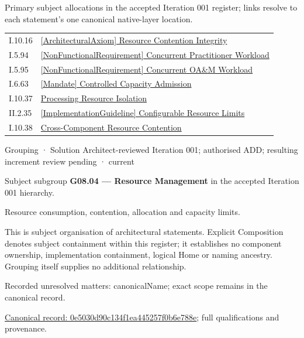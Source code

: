 Primary subject allocations in the accepted Iteration 001 register; links resolve to each statement’s one canonical native-layer location.\par
\begin{longtable}{p{.22\linewidth}p{.73\linewidth}}
I.10.16 & \hyperref[element:db8d320dc4c0454080f8c0f3c4e52801]{[ArchitecturalAxiom] Resource Contention Integrity} \\
I.5.94 & \hyperref[element:e77f2e780a974dde99815ff63158941c]{[NonFunctionalRequirement] Concurrent Practitioner Workload} \\
I.5.95 & \hyperref[element:5220295ae5d144468066ae70683e0f19]{[NonFunctionalRequirement] Concurrent OA\&M Workload} \\
I.6.63 & \hyperref[element:fb30eb9b8a3c41eda3a8b5edfee95ac1]{[Mandate] Controlled Capacity Admission} \\
I.10.37 & \hyperref[element:41ce95e00e064d809ad4bda818705510]{Processing Resource Isolation} \\
II.2.35 & \hyperref[element:4621a5cb0dbe445488439ac03398a8b5]{[ImplementationGuideline] Configurable Resource Limits} \\
I.10.38 & \hyperref[element:5bd9cc19d41e47d49978afaeea8343ed]{Cross-Component Resource Contention} \\
\end{longtable}
\label{element:0e5030d90c134f1ea445257f0b6e788e}
{\small Grouping · Solution Architect-reviewed Iteration 001; authorised ADD; resulting increment review pending · current}\par

Subject subgroup \textbf{G08.04 — Resource Management} in the accepted Iteration 001 hierarchy.



Resource consumption, contention, allocation and capacity limits.



This is subject organisation of architectural statements. Explicit Composition denotes subject containment within this register; it establishes no component ownership, implementation containment, logical Home or naming ancestry. Grouping itself supplies no additional relationship.


{\small Recorded unresolved matters: canonicalName; exact scope remains in the canonical record.}\par
{\footnotesize \href{../../../../continuum/grouping/0e5030d90c134f1ea445257f0b6e788e.md}{Canonical record: 0e5030d90c134f1ea445257f0b6e788e}; full qualifications and provenance.}\par
